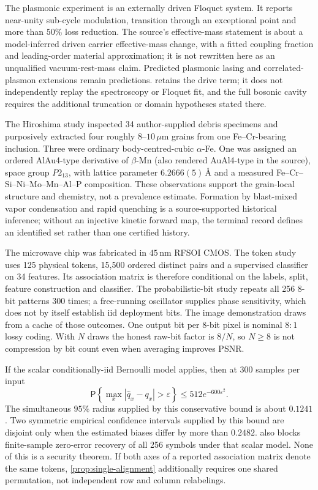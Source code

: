 \documentclass[11pt,a4paper]{article}
\theoremstyle{definition}
\theoremstyle{plain}
\theoremstyle{remark}
\newcommand{\Prob}{\mathsf P}
\begin{document}
The plasmonic experiment is an externally driven Floquet system.  It reports
near-unity sub-cycle modulation, transition through an exceptional point and
more than \(50\%\) loss reduction.  The source's effective-mass statement is
about a model-inferred driven carrier effective-mass change, with a fitted
coupling fraction and leading-order material approximation; it is not
rewritten here as an unqualified vacuum-rest-mass claim.  Predicted plasmonic
lasing and correlated-plasmon extensions remain predictions.
 retains the drive term; it does not independently
replay the spectroscopy or Floquet fit, and the full bosonic cavity requires
the additional truncation or domain hypotheses stated there.

The Hiroshima study inspected 34 author-supplied debris specimens and
purposively extracted four roughly \(8\)--\(10\,\mu\mathrm m\) grains from one
Fe--Cr-bearing inclusion.  Three were
ordinary body-centred-cubic \(\alpha\)-Fe.  One was assigned an ordered
AlAu4-type derivative of \(\beta\)-Mn (also rendered AuAl4-type in the
source), space group \(P2_13\), with lattice
parameter \(6.2666(5)\,\text{\AA}\) and a measured
Fe--Cr--Si--Ni--Mo--Mn--Al--P composition.  These observations support the
grain-local structure and chemistry, not a prevalence estimate.  Formation by blast-mixed vapor
condensation and rapid quenching is a source-supported historical inference;
without an injective kinetic forward map, the terminal record defines an
identified set rather than one certified history.

The microwave chip was fabricated in \(45\,\mathrm{nm}\) RFSOI CMOS.  The
token study uses 125 physical tokens, 15,500 ordered distinct pairs and a
supervised classifier on 34 features.  Its association matrix is therefore
conditional on the labels, split, feature construction and classifier.
The probabilistic-bit study repeats all 256 8-bit patterns 300 times; a
free-running oscillator supplies phase sensitivity, which does not by itself
establish iid deployment bits.  The image demonstration draws from a cache of
those outcomes.  One output bit per 8-bit pixel is nominal \(8{:}1\) lossy
coding.  With \(N\) draws the honest raw-bit factor is \(8/N\), so \(N\ge8\)
is not compression by bit count even when averaging improves PSNR.

If the scalar conditionally-iid Bernoulli model applies, then at 300 samples
per input
\[
\Prob\!\left\{\max_x|\widehat q_x-q_x|>\varepsilon\right\}
\le512e^{-600\varepsilon^2}.
\]
The simultaneous \(95\%\) radius supplied by this conservative bound is about
\(0.1241\).  Two symmetric empirical confidence intervals supplied by this
bound are disjoint only when the estimated biases differ by more than
\(0.2482\).
 also blocks finite-sample zero-error recovery of
all 256 symbols under that scalar model.  None of this is a security theorem.
If both axes of a reported association matrix denote the same tokens,
\cref{prop:single-alignment} additionally requires one shared permutation,
not independent row and column relabelings.
\end{document}
